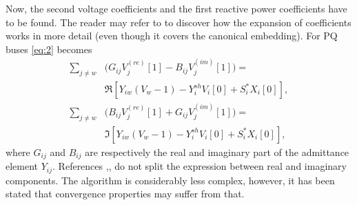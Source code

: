 \documentclass[journal]{IEEEtran}
\begin{document}
Now, the second voltage coefficients and the first reactive power coefficients have to be found. The reader may refer to \cite{Tylavsky1} to discover how the expansion of coefficients works in more detail (even though it covers the canonical embedding). For PQ buses \eqref{eq:2} becomes
\begin{equation}
  \begin{split}
    \sum_{j\neq w}&\biggl(G_{ij}V^{(re)}_j[1]-B_{ij}V^{(im)}_j[1]\biggr)=\\
    &\Re[Y_{iw}(V_w-1) - Y^{sh}_iV_i[0]+S^*_iX_i[0]],\\
    \sum_{j\neq w}&\biggl(B_{ij}V^{(re)}_j[1]+G_{ij}V^{(im)}_j[1]\biggr)=\\
    &\Im[Y_{iw}(V_w-1) - Y^{sh}_iV_i[0]+S^*_iX_i[0]],
  \end{split}
  \label{eq:14}
\end{equation}
where $G_{ij}$ and $B_{ij}$ are respectively the real and imaginary part of the admittance element $Y_{ij}$. References \cite{Novel},\cite{Schmidt},\cite{subramanianPV} do not split the expression between real and imaginary components. The algorithm is considerably less complex, however, it has been stated that convergence properties may suffer from that.
\end{document}
